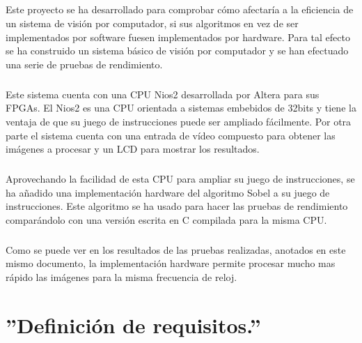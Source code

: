 \documentclass[a4paper,12pt,titlepage,final]{book}
\begin{document}
\paragraph{}
Este proyecto se ha desarrollado para comprobar cómo afectaría a la eficiencia
de un sistema de visión por computador, si sus algoritmos en vez de ser
implementados por software fuesen implementados por hardware. Para tal efecto se
ha construido un sistema básico de visión por computador y se han efectuado una
serie de pruebas de rendimiento.

\paragraph{}
Este sistema cuenta con una CPU Nios2 desarrollada por Altera para sus FPGAs. El
Nios2 es una CPU orientada a sistemas embebidos de 32bits y tiene la ventaja de
que su juego de instrucciones puede ser ampliado fácilmente. Por otra parte el
sistema cuenta con una entrada de vídeo compuesto para obtener las imágenes a
procesar y un LCD para mostrar los resultados.

\paragraph{}
Aprovechando la facilidad de esta CPU para ampliar su juego de instrucciones, se
ha añadido una implementación hardware del algoritmo Sobel a su juego de
instrucciones. Este algoritmo se ha usado para hacer las pruebas de rendimiento
comparándolo con una versión escrita en C compilada para la misma CPU.

\paragraph{}
Como se puede ver en los resultados de las pruebas realizadas, anotados en este
mismo documento, la implementación hardware permite procesar mucho mas rápido
las imágenes para la misma frecuencia de reloj.

\chapter{''Definición de requisitos.''}

\section*{}
\subsection*{}
\end{document}
